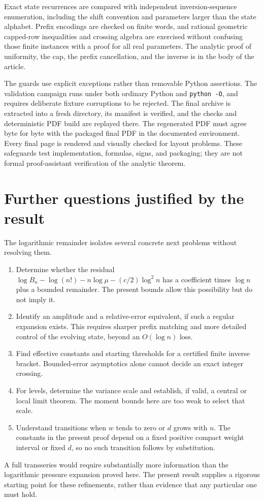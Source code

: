 \documentclass[11pt,a4paper]{article}
\theoremstyle{remark}\newtheorem{remark}[theorem]{Remark}
\numberwithin{equation}{section}
\begin{document}
Exact state recurrences are compared with independent inversion-sequence enumeration, including the shift convention and parameters larger than the state alphabet. Prefix encodings are checked on finite words, and rational geometric capped-row inequalities and crossing algebra are exercised without confusing those finite instances with a proof for all real parameters. The analytic proof of uniformity, the cap, the prefix cancellation, and the inverse is in the body of the article.

The guards use explicit exceptions rather than removable Python assertions. The validation campaign runs under both ordinary Python and \texttt{python -O}, and requires deliberate fixture corruptions to be rejected. The final archive is extracted into a fresh directory, its manifest is verified, and the checks and deterministic PDF build are replayed there. The regenerated PDF must agree byte for byte with the packaged final PDF in the documented environment. Every final page is rendered and visually checked for layout problems. These safeguards test implementation, formulas, signs, and packaging; they are not formal proof-assistant verification of the analytic theorem.

\section{Further questions justified by the result}\label{wasc:sh:sec:questions}
The logarithmic remainder isolates several concrete next problems without resolving them.
\begin{enumerate}[leftmargin=*,itemsep=4pt]
\item Determine whether the residual
$\log B_n-\log(n!)-n\log\mu-(c/2)\log^2n$ has a coefficient times $\log n$ plus a bounded remainder. The present bounds allow this possibility but do not imply it.
\item Identify an amplitude and a relative-error equivalent, if such a regular expansion exists. This requires sharper prefix matching and more detailed control of the evolving state, beyond an $O(\log n)$ loss.
\item Find effective constants and starting thresholds for a certified finite inverse bracket. Bounded-error asymptotics alone cannot decide an exact integer crossing.
\item For levels, determine the variance scale and establish, if valid, a central or local limit theorem. The moment bounds here are too weak to select that scale.
\item Understand transitions when $w$ tends to zero or $d$ grows with $n$. The constants in the present proof depend on a fixed positive compact weight interval or fixed $d$, so no such transition follows by substitution.
\end{enumerate}
A full transseries would require substantially more information than the logarithmic pressure expansion proved here. The present result supplies a rigorous starting point for these refinements, rather than evidence that any particular one must hold.
\end{document}
